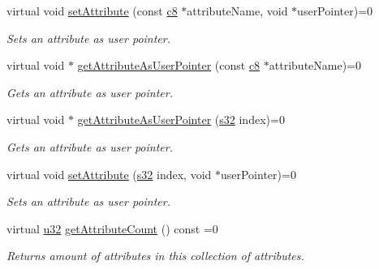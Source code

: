 \begin{DoxyCompactItemize}
virtual void \hyperlink{classirr_1_1io_1_1IAttributes_a558e6bb8c92226e99cd5b858db1b3ea8}{set\+Attribute} (const \hyperlink{namespaceirr_a9395eaea339bcb546b319e9c96bf7410}{c8} $\ast$attribute\+Name, void $\ast$user\+Pointer)=0
\begin{DoxyCompactList}\small\item\em Sets an attribute as user pointer. \end{DoxyCompactList}\item 
virtual void $\ast$ \hyperlink{classirr_1_1io_1_1IAttributes_a6f97e7af81f611bd13ced0378531ed2d}{get\+Attribute\+As\+User\+Pointer} (const \hyperlink{namespaceirr_a9395eaea339bcb546b319e9c96bf7410}{c8} $\ast$attribute\+Name)=0
\begin{DoxyCompactList}\small\item\em Gets an attribute as user pointer. \end{DoxyCompactList}\item 
virtual void $\ast$ \hyperlink{classirr_1_1io_1_1IAttributes_ae720da1bc66bc535ab839e95018d7398}{get\+Attribute\+As\+User\+Pointer} (\hyperlink{namespaceirr_ac66849b7a6ed16e30ebede579f9b47c6}{s32} index)=0
\begin{DoxyCompactList}\small\item\em Gets an attribute as user pointer. \end{DoxyCompactList}\item 
\mbox{\label{classirr_1_1io_1_1IAttributes_aacc6e6d6190d77651c5015ab4a911614}} 
virtual void \hyperlink{classirr_1_1io_1_1IAttributes_aacc6e6d6190d77651c5015ab4a911614}{set\+Attribute} (\hyperlink{namespaceirr_ac66849b7a6ed16e30ebede579f9b47c6}{s32} index, void $\ast$user\+Pointer)=0
\begin{DoxyCompactList}\small\item\em Sets an attribute as user pointer. \end{DoxyCompactList}\item 
\mbox{\label{classirr_1_1io_1_1IAttributes_a796bdd9440ee7ba0b6742a90a82870b6}} 
virtual \hyperlink{namespaceirr_a0416a53257075833e7002efd0a18e804}{u32} \hyperlink{classirr_1_1io_1_1IAttributes_a796bdd9440ee7ba0b6742a90a82870b6}{get\+Attribute\+Count} () const =0
\begin{DoxyCompactList}\small\item\em Returns amount of attributes in this collection of attributes. \end{DoxyCompactList}\item 

\end{DoxyCompactItemize}
